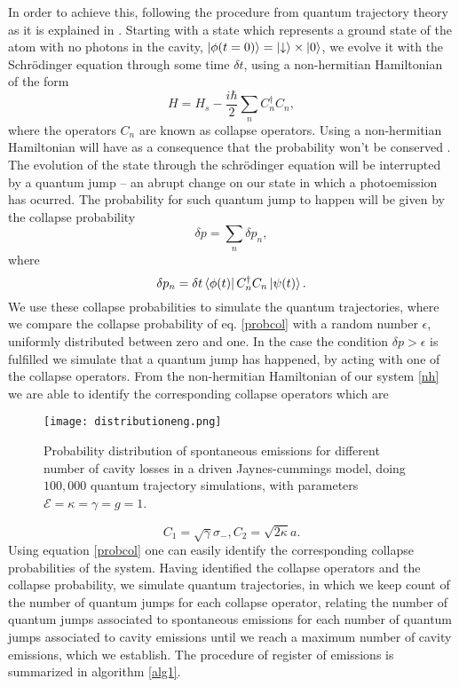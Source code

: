 \documentclass[conference]{IEEEtran}
\begin{document}
In order to achieve this, following the procedure from quantum trajectory theory as it is explained in \cite{bla}. Starting with a state which represents a ground state of the atom with no photons in the cavity, $\ket{\phi(t = 0)} = \ket{\downarrow} \times \ket{0}$, we evolve it with the Schrödinger equation through some time $\delta t$, using a non-hermitian Hamiltonian of the form
\begin{equation}
H = H_s - \frac{i\hbar}{2}\sum_n C^\dagger_n C_n,
\end{equation}
where the operators $C_n$ are known as collapse operators.
Using a non-hermitian Hamiltonian will have as a consequence that the probability won't be conserved \cite{Sakurai:1167961}. The evolution of the state through the schrödinger equation will be interrupted by a quantum jump – an abrupt change on our state in which a photoemission has ocurred. The probability for such quantum jump to happen will be given by the collapse probability
\begin{equation} \label{probcol}
\delta p = \sum_n \delta p_n,
\end{equation}
where 
\begin{equation}
\delta p_n = \delta t \bra{\phi (t)} C^\dagger_n C_n \ket{\psi (t)}.
\end{equation}
We use these collapse probabilities to simulate the quantum trajectories, where we compare the collapse probability of eq. \eqref{probcol} with a random number $\epsilon$, uniformly distributed between zero and one. In the case the condition $\delta p > \epsilon$ is fulfilled we simulate that a quantum jump has happened, by acting with one of the collapse operators. From the non-hermitian Hamiltonian of our system \eqref{nh} we are able to identify the corresponding collapse operators which are
\begin{figure}[!t] 
\centering
\texttt{[image: distributioneng.png]}
\caption{\small{Probability distribution of spontaneous emissions for different number of cavity losses in a driven Jaynes-cummings model, doing $100,000$ quantum trajectory simulations, with parameters $\mathcal{E}  = \kappa = \gamma = g = 1$.}} \label{probdiss}
\end{figure}
\begin{subequations}
\begin{equation}
C_1 = \sqrt{\gamma}\sigma_-,
\end{equation}
\begin{equation}
C_2 = \sqrt{2\kappa}a.
\end{equation}
\end{subequations}
Using equation \eqref{probcol} one can easily identify the corresponding collapse probabilities of the system. Having identified the collapse operators and the collapse probability, we simulate quantum trajectories, in which we keep count of the number of quantum jumps for each collapse operator, relating the number of quantum jumps associated to spontaneous emissions for each number of quantum jumps associated to cavity emissions until we reach a maximum number of cavity emissions, which we establish. The procedure of register of emissions is summarized in algorithm \ref{alg1}. \\
\end{document}
